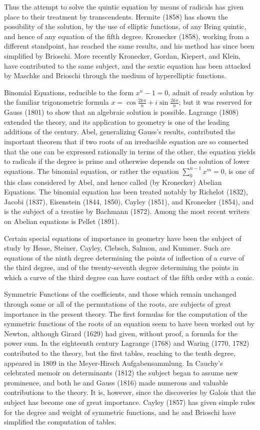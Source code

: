 \documentclass[oneside]{book}
\begin{document}
Thus the attempt to solve the quintic equation by means of radicals
has given place to their treatment by transcendents. Hermite (1858)
has shown the possibility of the solution, by the use of elliptic
functions, of any Bring quintic, and hence of any equation of the
fifth degree. Kronecker (1858), working from a different standpoint,
has reached the same results, and his method has since been
simplified by Brioschi. More recently Kronecker, Gordan, Kiepert,
and Klein, have contributed to the same subject, and the sextic
equation has been attacked by Maschke and Brioschi through the
medium of hyperelliptic functions.

Binomial Equations, reducible to the form $x^n - 1 = 0$, admit of
ready solution by the familiar trigonometric formula $x =
\cos\frac{2k\pi}{n} + i\sin\frac{2k\pi}{n}$; but it was reserved for
Gauss (1801) to show that an algebraic solution is
possible. Lagrange (1808) extended the theory, and its application
to geometry is one of the leading additions of the century. Abel,
generalizing Gauss's results, contributed the important theorem that
if two roots of an irreducible equation are so connected that the
one can be expressed rationally in terms of the other, the equation
yields to radicals if the degree is prime and otherwise depends on
the solution of lower equations. The binomial equation, or rather
the equation $\sum_0^{n-1} x^m = 0$, is one of this class
considered by Abel, and hence called (by Kronecker) Abelian
Equations. The binomial equation has been treated notably by
Richelot (1832), Jacobi (1837), Eisenstein (1844, 1850), Cayley
(1851), and Kronecker (1854), and is the subject of a treatise by
Bachmann (1872). Among the most recent writers on Abelian equations
is Pellet (1891).

Certain special equations of importance in geometry have been the
subject of study by Hesse, Steiner, Cayley, Clebsch, Salmon, and
Kummer. Such are equations of the ninth degree determining the
points of inflection of a curve of the third degree, and of the
twenty-seventh degree determining the points in which a curve of the
third degree can have contact of the fifth order with a conic.

Symmetric Functions of the coefficients, and those which remain
unchanged through some or all of the permutations of the roots, are
subjects of great importance in the present theory. The first
formulas for the computation of the symmetric functions of the
roots of an equation seem to have been worked out by Newton,
although Girard (1629) had given, without proof, a formula for the
power sum. In the eighteenth century Lagrange (1768) and Waring
(1770, 1782) contributed to the theory, but the first tables,
reaching to the tenth degree, appeared in 1809 in the Meyer-Hirsch
Aufgabensammlung. In Cauchy's celebrated memoir on determinants
(1812) the subject began to assume new prominence, and both he and
Gauss (1816) made numerous and valuable contributions to the
theory. It is, however, since the discoveries by Galois that the
subject has become one of great importance. Cayley (1857) has given
simple rules for the degree and weight of symmetric functions, and
he and Brioschi have simplified the computation of tables.
\end{document}
